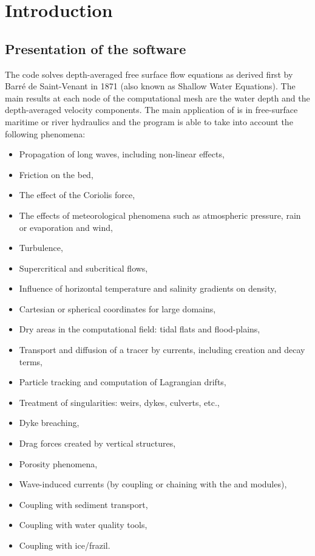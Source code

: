 \chapter{Introduction}
\label{ch:intro}


\section{Presentation of the  software}

The  code solves depth-averaged free surface flow equations
as derived first by Barr\'{e} de Saint-Venant in 1871
(also known as Shallow Water Equations).
The main results at each node of the computational mesh are the water depth
and the depth-averaged velocity components.
The main application of  is in free-surface maritime
or river hydraulics and the program is able to take into account the following
phenomena:

\begin{itemize}
\item Propagation of long waves, including non-linear effects,
\item Friction on the bed,
\item The effect of the Coriolis force,
\item The effects of meteorological phenomena such as atmospheric pressure, rain
 or evaporation and wind,
\item Turbulence,
\item Supercritical and subcritical flows,
\item Influence of horizontal temperature and salinity gradients on density,
\item Cartesian or spherical coordinates for large domains,
\item Dry areas in the computational field: tidal flats and flood-plains,
\item Transport and diffusion of a tracer by currents, including creation
and decay terms,
\item Particle tracking and computation of Lagrangian drifts,
\item Treatment of singularities: weirs, dykes, culverts, etc.,
\item Dyke breaching,
\item Drag forces created by vertical structures,
\item Porosity phenomena,
\item Wave-induced currents (by coupling or chaining with the \artemis and
\tomawac modules),
\item Coupling with sediment transport,
\item Coupling with water quality tools,
\item Coupling with ice/frazil.
\end{itemize}

